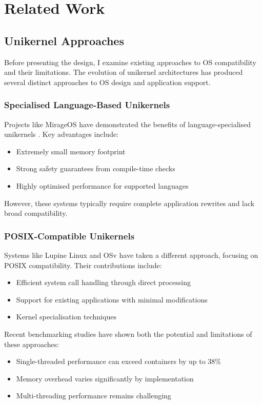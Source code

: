 \documentclass[conference]{IEEEtran}
\begin{document}
\section{Related Work}
\subsection{Unikernel Approaches}
Before presenting the design, I examine existing approaches to OS compatibility and their
limitations. The evolution of unikernel architectures has produced several distinct approaches to OS design and application support.

\subsubsection{Specialised Language-Based Unikernels}
Projects like MirageOS have demonstrated the benefits of language-specialised unikernels \cite{linux_kernel_clothing}. Key advantages include:
\begin{itemize}
	\item Extremely small memory footprint
	\item Strong safety guarantees from compile-time checks
	\item Highly optimised performance for supported languages
\end{itemize}

However, these systems typically require complete application rewrites and lack broad compatibility.

\subsubsection{POSIX-Compatible Unikernels}
Systems like Lupine Linux \cite{linux_kernel_clothing} and OSv have taken a different approach, focusing on POSIX compatibility. Their contributions include:
\begin{itemize}
	\item Efficient system call handling through direct processing
	\item Support for existing applications with minimal modifications
	\item Kernel specialisation techniques
\end{itemize}

Recent benchmarking studies \cite{unikernels_vs_containers} have shown both the potential and limitations of these approaches:
\begin{itemize}
	\item Single-threaded performance can exceed containers by up to 38\%
	\item Memory overhead varies significantly by implementation
	\item Multi-threading performance remains challenging
\end{itemize}
\end{document}
